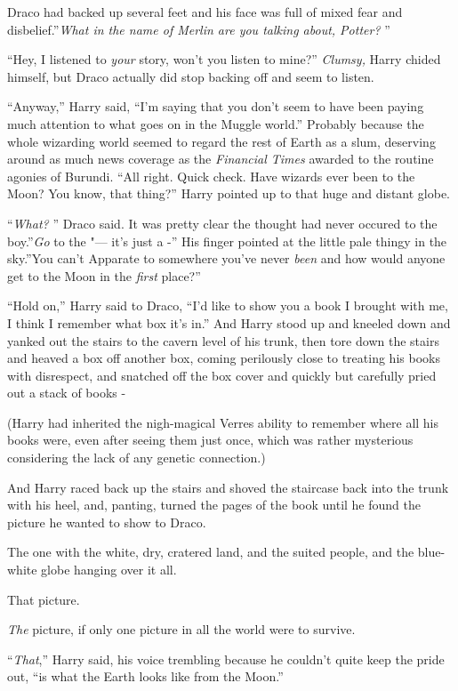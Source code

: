 Draco had backed up several feet and his face was full of mixed fear and
disbelief.''\emph{What in the name of Merlin are you talking about,
Potter?} ''

``Hey, I listened to \emph{your} story, won't you listen to mine?''
\emph{Clumsy,} Harry chided himself, but Draco actually did stop backing
off and seem to listen.

``Anyway,'' Harry said, ``I'm saying that you don't seem to have been
paying much attention to what goes on in the Muggle world.'' Probably
because the whole wizarding world seemed to regard the rest of Earth as
a slum, deserving around as much news coverage as the \emph{Financial
Times} awarded to the routine agonies of Burundi. ``All right. Quick
check. Have wizards ever been to the Moon? You know, that thing?'' Harry
pointed up to that huge and distant globe.

``\emph{What?} '' Draco said. It was pretty clear the thought had never
occured to the boy.''\emph{Go} to the "--- it's just a -'' His finger
pointed at the little pale thingy in the sky.''You can't Apparate to
somewhere you've never \emph{been} and how would anyone get to the Moon
in the \emph{first} place?''

``Hold on,'' Harry said to Draco, ``I'd like to show you a book I
brought with me, I think I remember what box it's in.'' And Harry stood
up and kneeled down and yanked out the stairs to the cavern level of his
trunk, then tore down the stairs and heaved a box off another box,
coming perilously close to treating his books with disrespect, and
snatched off the box cover and quickly but carefully pried out a stack
of books -

(Harry had inherited the nigh-magical Verres ability to remember where
all his books were, even after seeing them just once, which was rather
mysterious considering the lack of any genetic connection.)

And Harry raced back up the stairs and shoved the staircase back into
the trunk with his heel, and, panting, turned the pages of the book
until he found the picture he wanted to show to Draco.

The one with the white, dry, cratered land, and the suited people, and
the blue-white globe hanging over it all.

That picture.

\emph{The} picture, if only one picture in all the world were to
survive.

``\emph{That},'' Harry said, his voice trembling because he couldn't
quite keep the pride out, ``is what the Earth looks like from the
Moon.''

